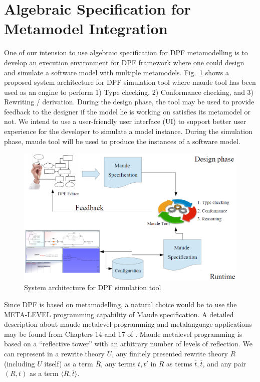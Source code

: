 \documentclass{eceasst}
\begin{document}
\section{Algebraic Specification for Metamodel Integration}\label{lbl:algebra}
One of our intension to use algebraic specification for DPF metamodelling is to develop an execution environment for DPF framework where one could design and simulate a software model with 
multiple metamodels. Fig.~\ref{fig:dpfmaude} shows a proposed system architecture for DPF simulation tool where maude tool has been used as an engine to perform 1) Type checking, 2) Conformance checking,
and 3) Rewriting / derivation. During the design phase, the tool may be used to provide feedback to the designer if the model he is working on satisfies its metamodel or not. 
We intend to use a user-friendly user interface (UI) to support better user experience for the developer to simulate a model instance. 
During the simulation phase, maude tool will be used to produce the instances of a software model. 



 
 \begin{figure}[h]
\centering
 \includegraphics[width=\textwidth]{dpfmaude.png}
 \caption{System architecture for DPF simulation tool}
 \label{fig:dpfmaude}
 \end{figure}

Since DPF is based on metamodelling, a natural choice would be to use the META-LEVEL programming capability of Maude specification. 
A detailed description about maude metalevel programming and metalanguage applications may be found from Chapters 14 and 17 of \cite{Clavel2007}. 
Maude metalevel programming is based on a ``reflective tower'' with an arbitrary number of levels of reflection. 
We can represent in a rewrite theory $U$, any finitely presented rewrite theory $R$ (including $U$ itself) as a term $\overline{R}$, any terms $t, t'$ in $R$ as terms $\overline{t}, \overline{t}$, 
and any pair $(R, t)$ as a term $\langle \overline{R}, \overline{t} \rangle$. 
\end{document}
